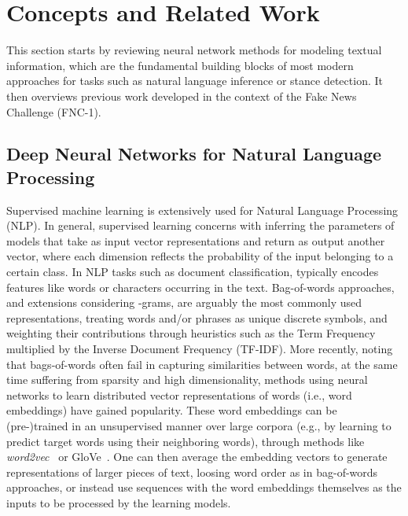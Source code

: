\section{Concepts and Related Work}

This section starts by reviewing neural network methods for modeling textual information, which are the fundamental building blocks of most modern approaches for tasks such as natural language inference or stance detection. It then overviews previous work developed in the context of the Fake News Challenge (FNC-1).

\subsection{Deep Neural Networks for Natural Language Processing}

Supervised machine learning is extensively used for Natural Language Processing (NLP). In general, supervised learning concerns with inferring the parameters of models that take as input vector representations  and return as output another vector, where each dimension reflects the probability of the input belonging to a certain class. In NLP tasks such as document classification,  typically encodes features like words or characters occurring in the text. Bag-of-words approaches, and extensions considering -grams, are arguably the most commonly used representations, treating words and/or phrases as unique discrete symbols, and weighting their contributions through heuristics such as the Term Frequency multiplied by the Inverse Document Frequency (TF-IDF). More recently, noting that bags-of-words often fail in capturing similarities between words, at the same time suffering from sparsity and high dimensionality, methods using neural networks to learn distributed vector representations of words (i.e., word embeddings) have gained popularity. These word embeddings can be (pre-)trained in an unsupervised manner over large corpora (e.g., by learning to predict target words using their neighboring words), through methods like \textit{word2vec}~\cite{word2vec} or GloVe~\cite{glove}. One can then average the embedding vectors to generate representations of larger pieces of text, loosing word order as in bag-of-words approaches, or instead use sequences with the word embeddings themselves as the inputs to be processed by the learning models.

